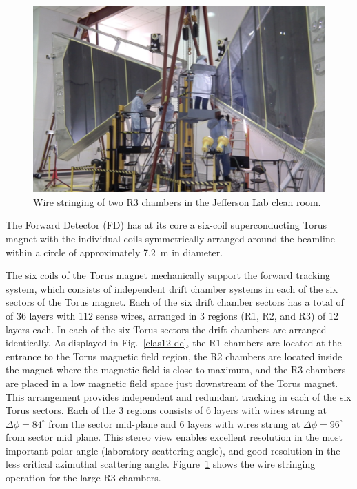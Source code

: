 \documentclass[final,3p,times,twocolumn,authoryear]{elsarticle}
\begin{document}
\begin{figure}[htbp!]
\centerline{\includegraphics[width=1.95\columnwidth]{DC-R3.png}}
\caption{\footnotesize  Wire stringing of two R3 chambers in 
the Jefferson Lab clean room.}
\label{dc-stringing}
\end{figure}


The Forward Detector (FD) has at its core a six-coil superconducting Torus magnet with the individual coils symmetrically arranged around the beamline within a circle of approximately 7.2~m in diameter. 

The six coils of the Torus magnet mechanically support the forward tracking system, which consists of 
independent drift chamber systems in each 
of the six sectors of the Torus magnet. Each of the six drift chamber sectors has a total of of 36 layers with 112 sense wires,
 arranged in 3 regions (R1, R2, and R3) of 12 layers each. In each of the six Torus sectors the drift chambers are arranged identically. As displayed in Fig.~\ref{clas12-dc}, the R1 chambers
are located at the entrance to the Torus magnetic field region, the R2 chambers are located inside the magnet where the magnetic field is close to maximum, 
and the R3 chambers are placed in a low magnetic field space just downstream of the Torus magnet. This arrangement provides independent and redundant tracking in each of the six Torus sectors. Each of the 3 regions consists of 6 layers with wires strung at $\Delta{\phi} = 84^\circ$ from the sector mid-plane and 6 layers with wires strung at $\Delta{\phi} = 96^\circ$ from 
sector mid plane. This stereo view enables excellent resolution in the most important polar angle (laboratory scattering angle), and good resolution in the less critical azimuthal scattering angle. Figure~\ref{dc-stringing} shows the wire stringing operation
for the large R3 chambers. 
\end{document}
